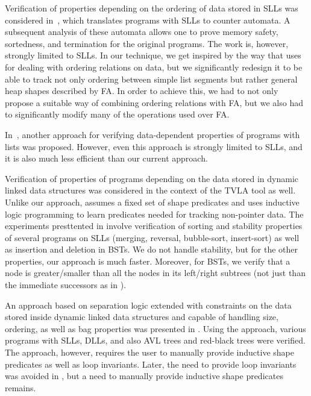 Verification of properties depending on the ordering of data stored in SLLs was
considered in~\cite{lists-counters}, which translates programs with SLLs to
counter automata. A subsequent analysis of these automata allows one to prove
memory safety, sortedness, and termination for the original programs. The work
is, however, strongly limited to SLLs. In our technique, we get inspired by the way
that \cite{lists-counters} uses for dealing with ordering relations on data, but
we significantly redesign it to be able to track not only ordering between
simple list segments but rather general heap shapes described by FA. In order to
achieve this, we had to not only propose a suitable way of combining ordering
relations with FA, but we also had to significantly modify many of the
operations used over FA.

In~\cite{atva09}, another approach for verifying data-dependent properties of
programs with lists was proposed. However, even this approach is strongly
limited to SLLs, and it is also much less efficient than our current approach.


Verification of properties of programs depending on the data stored in dynamic
linked data structures was considered in the context of the TVLA tool
\cite{Loginov:AbstrRefViaInductLearning:05} as well. Unlike our approach,
\cite{Loginov:AbstrRefViaInductLearning:05} assumes a fixed set of shape
predicates and uses inductive logic programming to learn predicates needed for
tracking non-pointer data. The experiments presttented in
\cite{Loginov:AbstrRefViaInductLearning:05} involve verification of sorting and
stability properties of several programs on SLLs (merging, reversal,
bubble-sort, insert-sort) as well as insertion and deletion in BSTs. We do not
handle stability, but for the other properties, our approach is much faster.
Moreover, for BSTs, we verify that a node is greater/smaller than all the nodes
in its left/right subtrees (not just than the immediate successors as in
\cite{Loginov:AbstrRefViaInductLearning:05}).

An approach based on separation logic extended with constraints on the data
stored inside dynamic linked data structures and capable of handling size,
ordering, as well as bag properties was presented in \cite{rival11}. Using the
approach, various programs with SLLs, DLLs, and also AVL trees and red-black
trees were verified. The approach, however, requires the user to manually
provide inductive shape predicates as well as loop invariants.  Later, the need
to provide loop invariants was avoided in \cite{sleek13}, but a need to manually
provide inductive shape predicates remains.


